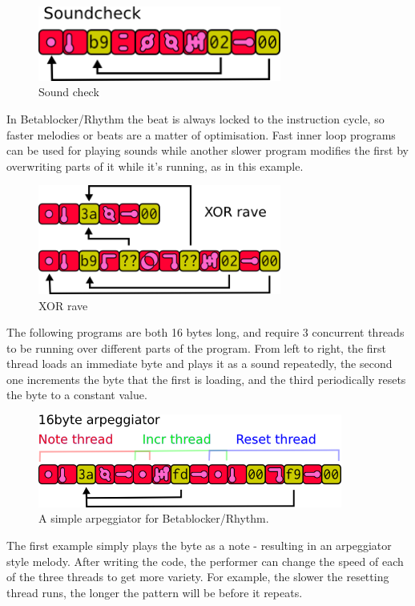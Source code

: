 \documentclass[letterpaper, 12pt]{article}
\begin{document}
\begin{figure}[H]
	\centering
		\includegraphics[width=8cm]{bbds-sndchk1}
	\caption{Sound check}
	\label{fig:fig_bbds-sndchk1}
\end{figure}

In Betablocker/Rhythm the beat is always locked to the instruction cycle, so faster melodies or beats are a matter of optimisation. Fast inner loop programs can be used for playing sounds while another slower program modifies the first by overwriting parts of it while it's running, as in this example. 

\begin{figure}[H]
	\centering
		\includegraphics[width=8cm]{bbds-xorrave}
	\caption{XOR rave}
	\label{fig:fig_bbds-xorrave}
\end{figure}

The following programs are both 16 bytes long, and require 3 concurrent threads to be running over different parts of the program. From left to right, the first thread loads an immediate byte and plays it as a sound repeatedly, the second one increments the byte that the first is loading, and the third periodically resets the byte to a constant value.
 
\begin{figure}[H]
	\centering
		\includegraphics[width=10cm]{bbds-arp}
	\caption{A simple arpeggiator for Betablocker/Rhythm.}
	\label{fig:fig_bbds-arp}
\end{figure}

The first example simply plays the byte as a note - resulting in an arpeggiator style melody. After writing the code, the performer can change the speed of each of the three threads to get more variety. For example, the slower the resetting thread runs, the longer the pattern will be before it repeats.
\end{document}
